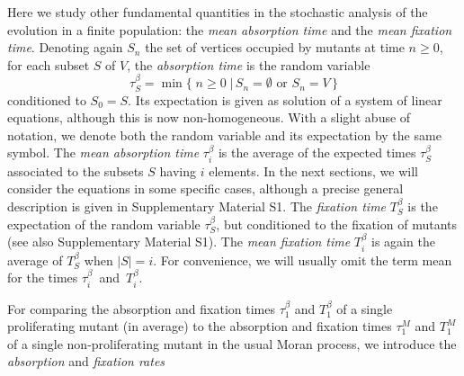 \documentclass[a4paper,english,10pt]{amsart}
\theoremstyle{definition}
\numberwithin{equation}{section}
\begin{document}
Here we study other fundamental quantities in the stochastic analysis of the evolution in a finite population: the \emph{mean absorption time} and the \emph{mean fixation time}. 
Denoting again $S_n$ the set of vertices occupied by mutants at time $n\geq 0$, 
for each subset $S$ of $V$, the \emph{absorption time} is the random variable 
$$
\tau^\beta_S = \min \{ \; n\geq 0 \; | \, S_n = \emptyset \text{ or } S_n =V \, \}
$$
conditioned to $S_0 = S$. Its expectation is given as solution of a system of linear equations, although this is now non-homogeneous. With a slight abuse of notation, we denote both the random variable and its expectation by the same symbol. The \emph{mean absorption time} $\tau^\beta_i$ is the average of the expected times $\tau^\beta_S$ associated to the subsets $S$ having $i$ elements.
In the next sections, we will consider the equations in some specific cases, although a precise general description is given in Supplementary Material S1.  
The \emph{fixation time} $T^\beta_S$ is the expectation of the random variable $\tau^\beta_S$, but conditioned to the fixation of mutants (see also Supplementary Material S1). The \emph{mean fixation time} $T^\beta_i$ is again the average of $T^\beta_S$ when $|S|=i$. 
 For convenience, we will usually omit the term mean for the times \mbox{$\tau^\beta_i$ and $T^\beta_i$.}

For comparing the absorption and fixation times $\tau^\beta_1$ and $T^\beta_1$ of a single proliferating mutant (in average) to the absorption and fixation times $\tau^M_1$ and $T^M_1$ of a single non-proliferating mutant in the usual Moran process, we introduce the \emph{absorption} and \emph{fixation rates}
\end{document}

